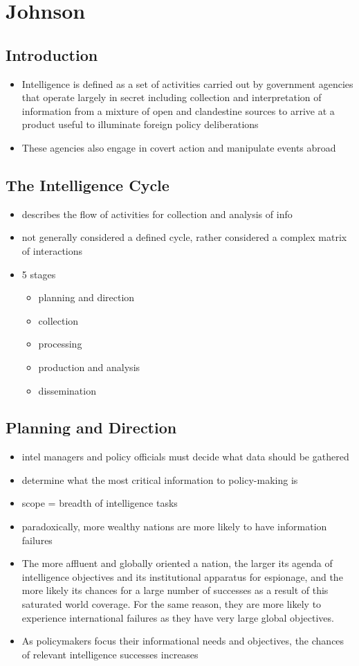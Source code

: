 \documentclass[11pt]{article}
\begin{document}
\section{Johnson}
\label{sec:org9dfa9bf}
\subsection{Introduction}
\label{sec:org07b1f67}
\begin{itemize}
\item Intelligence is defined as a set of activities carried out by government agencies that operate largely in secret including collection and interpretation of information from a mixture of open and clandestine sources to arrive at a product useful to illuminate foreign policy deliberations
\item These agencies also engage in covert action and manipulate events abroad
\end{itemize}
\subsection{The Intelligence Cycle}
\label{sec:org3756630}
\begin{itemize}
\item describes the flow of activities for collection and analysis of info
\item not generally considered a defined cycle, rather considered a complex matrix of interactions
\item 5 stages
\begin{itemize}
\item planning and direction
\item collection
\item processing
\item production and analysis
\item dissemination
\end{itemize}
\end{itemize}
\subsection{Planning and Direction}
\label{sec:orgb34396a}
\begin{itemize}
\item intel managers and policy officials must decide what data should be gathered
\item determine what the most critical information to policy-making is
\item scope = breadth of intelligence tasks
\item paradoxically, more wealthy nations are more likely to have information failures
\item The more affluent and globally oriented a nation, the larger its agenda of intelligence objectives and its institutional apparatus for espionage, and the more
likely its chances for a large number of successes as a result of this saturated
world coverage. For the same reason, they are more likely to experience international failures as they have very large global objectives.
\item As policymakers focus their informational needs and objectives, the chances of relevant intelligence successes increases
\end{itemize}
\end{document}
